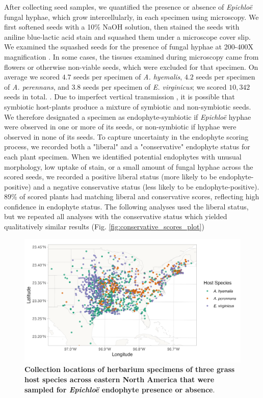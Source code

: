\documentclass[11pt]{article}
\let\cite\citep
\begin{document}
After collecting seed samples, we quantified the presence or absence of \emph{Epichloë} fungal hyphae, which grow intercellularly, in each specimen using microscopy. 
We first softened seeds with a 10\% NaOH solution, then stained the seeds with aniline blue-lactic acid stain and squashed them under a microscope cover slip. 
We examined the squashed seeds for the presence of fungal hyphae at 200-400X magnification \cite{bacon2018stains}.
In some cases, the tissues examined during microscopy came from flowers or otherwise non-viable seeds, which were excluded for that specimen.
On average we scored $4.7$ seeds per specimen of \emph{A. hyemalis}, $4.2$ seeds per specimen of \emph{A. perennans}, and $3.8$ seeds per specimen of \emph{E. virginicus}; we scored $10,342$ seeds in total. .
Due to imperfect vertical transmission \cite{afkhami2008symbiosis}, it is possible that symbiotic host-plants produce a mixture of symbiotic and non-symbiotic seeds. 
We therefore designated a specimen as endophyte-symbiotic if \emph{Epichloë} hyphae were observed in one or more of its seeds, or non-symbiotic if hyphae were observed in none of its seeds. 
To capture uncertainty in the endophyte scoring process, we recorded both a "liberal" and a "conservative" endophyte status for each plant specimen.  
When we identified potential endophytes with unusual morphology, low uptake of stain, or a small amount of fungal hyphae across the scored seeds, we recorded a positive liberal status (more likely to be endophyte-positive) and a negative conservative status (less likely to be endophyte-positive). 
$89$\% of scored plants had matching liberal and conservative scores, reflecting high confidence in endophyte status.
The following analyses used the liberal status, but we repeated all analyses with the conservative status which yielded qualitatively similar results (Fig. \ref{fig:conservative_scores_plot})

\begin{figure}[h]
	\centering
	\includegraphics[width = \linewidth]{../Plots/collections_map.png}
	\caption{\textbf{Collection locations of herbarium specimens of three grass host species across eastern North America that were sampled for \emph{Epichloë} endophyte presence or absence}.}
	\label{fig:map}
\end{figure}
\end{document}
